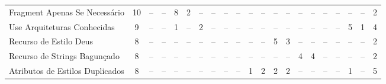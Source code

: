\begin{table*}[t]
\begin{tabular}{@{}p{3.8cm}p{0.3cm}p{.2cm}p{.2cm}p{.2cm}p{.2cm}p{.2cm}p{.2cm}p{.2cm}p{.2cm}p{.2cm}p{.4cm}p{.4cm}p{.4cm}p{.4cm}p{.4cm}p{.4cm}p{.4cm}p{.4cm}p{.4cm}p{0.2cm}@{}}
Fragment Apenas Se Necess\'ario				& \multicolumn{1}{c}{10} 	& \multicolumn{1}{c}{--} 	& \multicolumn{1}{c}{--} 	& \multicolumn{1}{c}{8} 	& \multicolumn{1}{c}{2} 	& \multicolumn{1}{c}{--} 	& \multicolumn{1}{c}{--} 	& \multicolumn{1}{c}{--} 	& \multicolumn{1}{c}{--} 	& \multicolumn{1}{c}{--} 	& \multicolumn{1}{c}{--} 	& \multicolumn{1}{c}{--} 	& \multicolumn{1}{c}{--} 	& \multicolumn{1}{c}{--} 	& \multicolumn{1}{c}{--} 	& \multicolumn{1}{c}{--} 	& \multicolumn{1}{c}{--} 	& \multicolumn{1}{c}{--} 	& \multicolumn{1}{c}{--} 	& \multicolumn{1}{c}{2} \\
Use Arquiteturas Conhecidas					& \multicolumn{1}{c}{9} 	& \multicolumn{1}{c}{--} 	& \multicolumn{1}{c}{--} 	& \multicolumn{1}{c}{1} 	& \multicolumn{1}{c}{--} 	& \multicolumn{1}{c}{2} 	& \multicolumn{1}{c}{--} 	& \multicolumn{1}{c}{--} 	& \multicolumn{1}{c}{--} 	& \multicolumn{1}{c}{--} 	& \multicolumn{1}{c}{--} 	& \multicolumn{1}{c}{--} 	& \multicolumn{1}{c}{--} 	& \multicolumn{1}{c}{--} 	& \multicolumn{1}{c}{--} 	& \multicolumn{1}{c}{--} 	& \multicolumn{1}{c}{--} 	& \multicolumn{1}{c}{5} 	& \multicolumn{1}{c}{1} 	& \multicolumn{1}{c}{4} \\
Recurso de Estilo Deus						& \multicolumn{1}{c}{8} 	& \multicolumn{1}{c}{--} 	& \multicolumn{1}{c}{--} 	& \multicolumn{1}{c}{--} 	& \multicolumn{1}{c}{--} 	& \multicolumn{1}{c}{--} 	& \multicolumn{1}{c}{--} 	& \multicolumn{1}{c}{--} 	& \multicolumn{1}{c}{--} 	& \multicolumn{1}{c}{--} 	& \multicolumn{1}{c}{--} 	& \multicolumn{1}{c}{5} 	& \multicolumn{1}{c}{3} 	& \multicolumn{1}{c}{--} 	& \multicolumn{1}{c}{--} 	& \multicolumn{1}{c}{--} 	& \multicolumn{1}{c}{--} 	& \multicolumn{1}{c}{--} 	& \multicolumn{1}{c}{--} 	& \multicolumn{1}{c}{2} \\
Recurso de Strings Bagun\c{c}ado			& \multicolumn{1}{c}{8} 	& \multicolumn{1}{c}{--} 	& \multicolumn{1}{c}{--} 	& \multicolumn{1}{c}{--} 	& \multicolumn{1}{c}{--} 	& \multicolumn{1}{c}{--} 	& \multicolumn{1}{c}{--} 	& \multicolumn{1}{c}{--} 	& \multicolumn{1}{c}{--} 	& \multicolumn{1}{c}{--} 	& \multicolumn{1}{c}{--} 	& \multicolumn{1}{c}{--} 	& \multicolumn{1}{c}{--} 	& \multicolumn{1}{c}{4} 	& \multicolumn{1}{c}{4} 	& \multicolumn{1}{c}{--} 	& \multicolumn{1}{c}{--} 	& \multicolumn{1}{c}{--} 	& \multicolumn{1}{c}{--} 	& \multicolumn{1}{c}{2} \\
Atributos de Estilos Duplicados				& \multicolumn{1}{c}{8} 	& \multicolumn{1}{c}{--} 	& \multicolumn{1}{c}{--} 	& \multicolumn{1}{c}{--} 	& \multicolumn{1}{c}{--} 	& \multicolumn{1}{c}{--} 	& \multicolumn{1}{c}{--} 	& \multicolumn{1}{c}{--} 	& \multicolumn{1}{c}{--} 	& \multicolumn{1}{c}{1} 	& \multicolumn{1}{c}{2} 	& \multicolumn{1}{c}{2} 	& \multicolumn{1}{c}{2} 	& \multicolumn{1}{c}{--} 	& \multicolumn{1}{c}{--} 	& \multicolumn{1}{c}{--} 	& \multicolumn{1}{c}{--} 	& \multicolumn{1}{c}{1} 	& \multicolumn{1}{c}{--} 	& \multicolumn{1}{c}{5} \\


\end{tabular}
\end{table*}
